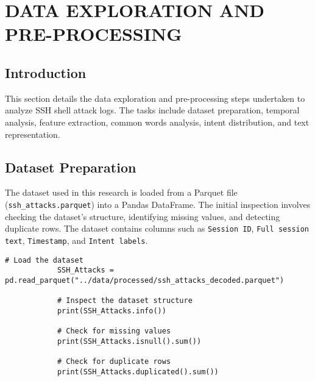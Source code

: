 

\section{DATA EXPLORATION AND PRE-PROCESSING}


    \subsection{Introduction}

        This section details the data exploration and pre-processing steps undertaken to analyze SSH shell attack logs. The tasks include dataset preparation, temporal analysis, feature extraction, common words analysis, intent distribution, and text representation.

    \subsection{Dataset Preparation}
    
        The dataset used in this research is loaded from a Parquet file (\texttt{ssh\_attacks.parquet}) into a Pandas DataFrame. The initial inspection involves checking the dataset's structure, identifying missing values, and detecting duplicate rows. The dataset contains columns such as \texttt{Session ID}, \texttt{Full session text}, \texttt{Timestamp}, and \texttt{Intent labels}.

        \begin{lstlisting}[caption={Load and inspect the dataset}, label={lst:load-inspect-dataset}]
            # Load the dataset
            SSH_Attacks = pd.read_parquet("../data/processed/ssh_attacks_decoded.parquet")
    
            # Inspect the dataset structure
            print(SSH_Attacks.info())
    
            # Check for missing values
            print(SSH_Attacks.isnull().sum())
    
            # Check for duplicate rows
            print(SSH_Attacks.duplicated().sum())
        \end{lstlisting}
        
